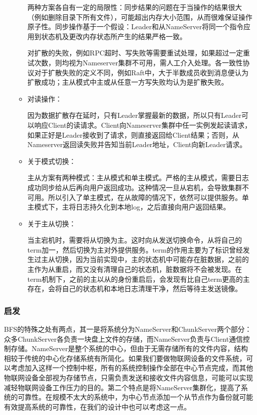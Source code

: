 \documentclass{ctexart}
\begin{document}
\begin{enumerate}
\begin{itemize}
		两种方案各自有一定的局限性：同步结果的问题在于当操作的结果很大（例如删除目录下所有文件），可能超出内存大小范围，从而很难保证操作原子性。同步操作基于一个假设：Leader和从NameServer将同一个指令应用到状态机及更改内存状态所产生的结果严格一致。

		对扩散的失败，例如RPC超时、写失败等需要重试处理，如果超过一定重试次数，则均视为Nameserver集群不可用，需人工介入处理。各一致性协议对于扩散失败的定义不同，例如Raft中，大于半数成员收到消息便认为扩散成功；主从模式中主或从任意一方写失败均认为是扩散失败。
		\item 对读操作：

		因为数据扩散存在延时，只有Leader掌握最新的数据，所以只有Leader可以响应Client的读请求。Client向Nameserver集群中任一实例发起读请求，如果正好是Leader接收到了请求，则直接返回给Client结果；否则，从Nameserver返回读失败并告知当前Leader地址，Client向新Leader请求。
		\item 关于模式切换：

		主从方案有两种模式：主从模式和单主模式。严格的主从模式，需要日志成功同步给从后再向用户返回成功。这种情况一旦从宕机，会导致集群不可用。所以引入了单主模式，在从故障的情况下，依然可以提供服务。单主模式下，主将日志持久化到本地log，之后直接向用户返回结果。
		\item 关于主从切换：

		当主宕机时，需要将从切换为主。这时向从发送切换命令，从将自己的term加一，然后切换为主对外提供服务。term的作用主要为了标识曾经发生过主从切换，因为当前实现中，主的状态机中可能存在脏数据，之前的主作为从重启，而又没有清理自己的状态机，脏数据将不会被发现。在term机制下，之前的主以从的身份重启后，会发现有比自己term更高的主存在，会将自己的状态机和本地日志清理干净，然后等待主发送镜像。
	\end{itemize}
\end{enumerate}
\subsubsection{启发}
BFS的特殊之处有两点，其一是将系统分为NameServer和ChunkServer两个部分：众多ChunkServer各负责一块盘上文件的存储，而NameServer负责与Client通信控制存储。NameServer是整个系统的中心，但由于无需存储所有的文件内容，结构相较于传统的中心化存储系统有所简化。如果我们要做物联网设备的文件系统，可以考虑加入这样一个控制中枢，所有的系统控制操作全部在中心节点完成，而其他物联网设备全部视为存储节点，只需负责发送和接收文件内容信息，可能可以实现减轻物联网设备工作压力的目的。第二个特点是将NameServer集群化，提高了系统的可靠性。在规模不太大的系统中，为中心节点添加一个从节点作为备份就可能有效提高系统的可靠性，在我们的设计中也可以考虑这一点。
\end{document}
